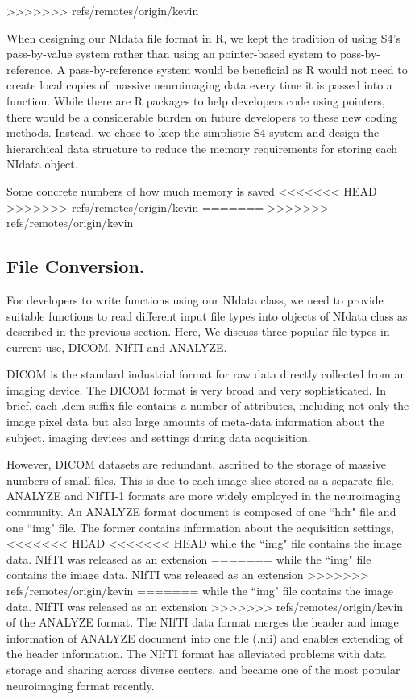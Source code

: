 \documentclass{nature}
\begin{document}
>>>>>>> refs/remotes/origin/kevin

When designing our NIdata file format in R, we kept the tradition of using S4's
pass-by-value system rather than using an pointer-based system to
pass-by-reference.
A pass-by-reference system would be beneficial as R would not need to 
create local copies of massive neuroimaging data every time it is passed into a
function. While there are R packages to help developers
code using pointers\cite{bengtsson2003r}, there would be a 
considerable burden on future developers to these new coding methods.
Instead, we chose to keep the simplistic S4 system and design the hierarchical
data structure to reduce the memory requirements for storing each NIdata object.

{\color{red}Some concrete numbers of how much memory is saved}
<<<<<<< HEAD
>>>>>>> refs/remotes/origin/kevin
=======
>>>>>>> refs/remotes/origin/kevin

\subsection{File Conversion.}
For developers to write functions using our NIdata class, we need to provide
suitable functions to read different input file types into objects of NIdata
class as described in the previous section. Here, We discuss three popular file
types in current use, DICOM, NIfTI and ANALYZE.

DICOM is the standard industrial
format for raw data directly collected from an imaging device. The DICOM format
is very broad and very sophisticated. In brief, each .dcm suffix file contains a
number of attributes, including not only the image pixel data but also large
amounts of meta-data information about the subject, imaging devices and settings
during data acquisition.

However, DICOM datasets are redundant, ascribed to the storage of massive
numbers of small files. This is due to each image slice stored as a separate
file. ANALYZE and NIfTI-1 formats are more widely employed in the neuroimaging
community. An ANALYZE format document is composed of one ``hdr" file and one
``img" file. The former contains information about the acquisition settings,
<<<<<<< HEAD
<<<<<<< HEAD
while the ``img" file contains the image data. NIfTI was released as an extension
=======
while the ``img" file contains the image data. NIfTI was released as an
extension
>>>>>>> refs/remotes/origin/kevin
=======
while the ``img" file contains the image data. NIfTI was released as an
extension
>>>>>>> refs/remotes/origin/kevin
of the ANALYZE format. The NIfTI data format merges the header and image
information of ANALYZE document into one file (.nii) and enables extending of
the header information. The NIfTI format has alleviated problems with data
storage and sharing across diverse centers, and became one of the most popular
neuroimaging format recently.
\end{document}
